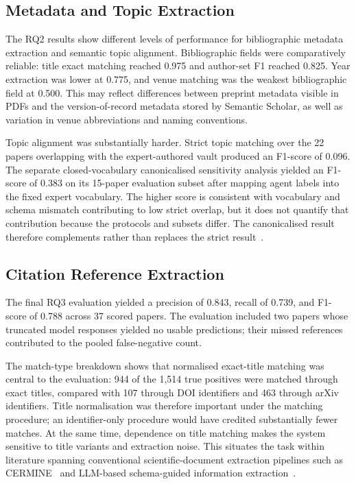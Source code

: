 \documentclass[runningheads]{llncs}
\begin{document}
\subsection{Metadata and Topic Extraction}

The RQ2 results show different levels of performance for bibliographic
metadata extraction and semantic topic alignment. Bibliographic fields were comparatively reliable: title exact matching reached 0.975 and
author-set F1 reached 0.825. Year extraction was lower at 0.775, and
venue matching was the weakest bibliographic field at 0.500. This may reflect differences between preprint metadata visible in PDFs and the
version-of-record metadata stored by Semantic Scholar, as well as
variation in venue abbreviations and naming conventions.

Topic alignment was substantially harder. Strict topic matching over
the 22 papers overlapping with the expert-authored vault produced an
F1-score of 0.096. The separate closed-vocabulary canonicalised
sensitivity analysis yielded an F1-score of 0.383 on its 15-paper
evaluation subset after mapping agent labels into the fixed expert
vocabulary. The higher score is consistent with vocabulary and schema
mismatch contributing to low strict overlap, but it does not quantify
that contribution because the protocols and subsets differ. The
canonicalised result therefore complements rather than replaces the
strict result~\cite{furnas1987vocabulary,balog2019personal}.

\subsection{Citation Reference Extraction}

The final RQ3 evaluation yielded a precision of 0.843, recall of 0.739,
and F1-score of 0.788 across 37 scored papers. The evaluation included two papers whose truncated model responses
yielded no usable predictions; their missed references contributed to
the pooled false-negative count.

The match-type breakdown shows that normalised exact-title matching was
central to the evaluation: 944 of the 1,514 true positives were matched
through exact titles, compared with 107 through DOI identifiers and 463
through arXiv identifiers. Title normalisation was therefore important
under the matching procedure; an identifier-only procedure would have
credited substantially fewer matches. At the same time, dependence on
title matching makes the system sensitive to title variants and
extraction noise. This situates the task within literature spanning
conventional scientific-document extraction pipelines such as
CERMINE~\cite{tkaczyk2015cermine} and LLM-based schema-guided
information extraction~\cite{xu2024large}.
\end{document}
